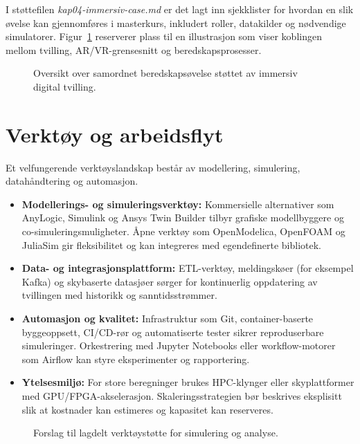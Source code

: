 I støttefilen \textit{kap04-immersiv-case.md} er det lagt inn sjekklister for hvordan en slik øvelse kan gjennomføres i masterkurs, inkludert roller, datakilder og nødvendige simulatorer. Figur~\ref{fig:kap04-beredskap-case} reserverer plass til en illustrasjon som viser koblingen mellom tvilling, AR/VR-grensesnitt og beredskapsprosesser.

\begin{figure}[htbp]
    \centering
    \caption{Oversikt over samordnet beredskapsøvelse støttet av immersiv digital tvilling.}
    \label{fig:kap04-beredskap-case}
\end{figure}

\section{Verktøy og arbeidsflyt}
Et velfungerende verktøyslandskap består av modellering, simulering, datahåndtering og automasjon.

\begin{itemize}
    \item \textbf{Modellerings- og simuleringsverktøy:} Kommersielle alternativer som AnyLogic, Simulink og Ansys Twin Builder tilbyr grafiske modellbyggere og co-simuleringsmuligheter. Åpne verktøy som OpenModelica, OpenFOAM og JuliaSim gir fleksibilitet og kan integreres med egendefinerte bibliotek.
    \item \textbf{Data- og integrasjonsplattform:} ETL-verktøy, meldingskøer (for eksempel Kafka) og skybaserte datasjøer sørger for kontinuerlig oppdatering av tvillingen med historikk og sanntidsstrømmer.
    \item \textbf{Automasjon og kvalitet:} Infrastruktur som Git, container-baserte byggeoppsett, CI/CD-rør og automatiserte tester sikrer reproduserbare simuleringer. Orkestrering med Jupyter Notebooks eller workflow-motorer som Airflow kan styre eksperimenter og rapportering.
    \item \textbf{Ytelsesmiljø:} For store beregninger brukes HPC-klynger eller skyplattformer med GPU/FPGA-akselerasjon. Skaleringsstrategien bør beskrives eksplisitt slik at kostnader kan estimeres og kapasitet kan reserveres.
\end{itemize}

\begin{figure}[htbp]
    \centering
    \caption{Forslag til lagdelt verktøystøtte for simulering og analyse.}
    \label{fig:kap04-verktoystakk}
\end{figure}


